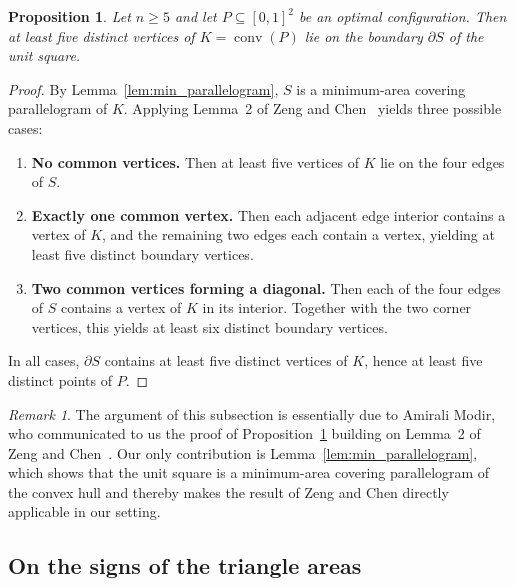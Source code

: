 \documentclass[11pt,a4paper]{article}
\theoremstyle{plain}
\newtheorem{proposition}{Proposition}
\theoremstyle{definition}
\theoremstyle{remark}
\newtheorem{remark}{Remark}
\begin{document}
\begin{proposition}\label{thm:boundary_vertices}
Let $n\ge 5$ and let $P\subseteq[0,1]^2$ be an optimal configuration.
Then at least five distinct vertices of $K=\operatorname{conv}(P)$
lie on the boundary $\partial S$ of the unit square.
\end{proposition}

\begin{proof}
By Lemma~\ref{lem:min_parallelogram}, $S$ is a minimum-area covering parallelogram of $K$.
Applying Lemma~2 of Zeng and Chen~\cite{ZengChen2011} yields three possible cases:

\begin{enumerate}
\item \textbf{No common vertices.}
Then at least five vertices of $K$ lie on the four edges of $S$.

\item \textbf{Exactly one common vertex.}
Then each adjacent edge interior contains a vertex of $K$,
and the remaining two edges each contain a vertex,
yielding at least five distinct boundary vertices.

\item \textbf{Two common vertices forming a diagonal.}
Then each of the four edges of $S$ contains a vertex of $K$
in its interior.
Together with the two corner vertices,
this yields at least six distinct boundary vertices.
\end{enumerate}

In all cases, $\partial S$ contains at least five distinct vertices of $K$,
hence at least five distinct points of $P$.
\end{proof}

\begin{remark}
  The argument of this subsection is essentially due to Amirali Modir, who
  communicated to us the proof of Proposition~\ref{thm:boundary_vertices}
  building on Lemma~2 of Zeng and Chen~\cite{ZengChen2011}. Our only
  contribution is Lemma~\ref{lem:min_parallelogram}, which shows that the unit
  square is a minimum-area covering parallelogram of the convex hull and thereby
  makes the result of Zeng and Chen directly applicable in our setting.
\end{remark}

\subsection{On the signs of the triangle areas}\label{sec: triangle sign}
\end{document}
